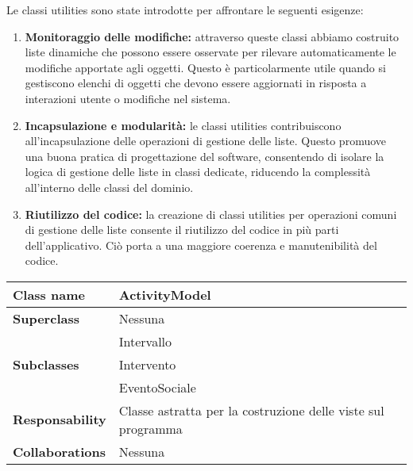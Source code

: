 Le classi utilities sono state introdotte per affrontare le seguenti esigenze:
\begin{enumerate}
	\item \textbf{Monitoraggio delle modifiche:} attraverso queste classi abbiamo costruito liste dinamiche che possono essere osservate per rilevare automaticamente le modifiche apportate agli oggetti. Questo è particolarmente utile quando si gestiscono elenchi di oggetti che devono essere aggiornati in risposta a interazioni utente o modifiche nel sistema.
	\item \textbf{Incapsulazione e modularità:} le classi utilities contribuiscono all'incapsulazione delle operazioni di gestione delle liste. Questo promuove una buona pratica di progettazione del software, consentendo di isolare la logica di gestione delle liste in classi dedicate, riducendo la complessità all'interno delle classi del dominio.
	\item \textbf{Riutilizzo del codice:} la creazione di classi utilities per operazioni comuni di gestione delle liste consente il riutilizzo del codice in più parti dell'applicativo. Ciò porta a una maggiore coerenza e manutenibilità del codice.
\end{enumerate}
\begin{table}[h!]
	\begin{tabular}{|l|l|}
		\hline 
		\textbf{Class name} & ActivityModel
		\\ \hline
		\textbf{Superclass} & Nessuna
		\\ \hline
		\multirow{3}{*}{\textbf{Subclasses}} & Intervallo \\
		& Intervento \\
		& EventoSociale \\ \hline
		\textbf{Responsability} & Classe astratta per la costruzione delle viste sul programma
		\\ \hline
		\multirow{1}{*}{\textbf{Collaborations}} & Nessuna
		\\ \hline
	\end{tabular}
\end{table}

